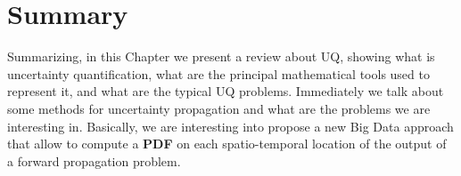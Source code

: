 %

\section{Summary}\label{sec:background_summary}

Summarizing, in this Chapter we present a review about UQ, showing what is uncertainty quantification, what are the principal mathematical tools used to represent it, and what are the typical UQ problems. Immediately we talk about some methods for uncertainty propagation and what are the problems we are interesting in. Basically, we are interesting into propose a new Big Data approach that allow to compute a \textbf{PDF} on each spatio-temporal location of the output of a forward propagation problem.


